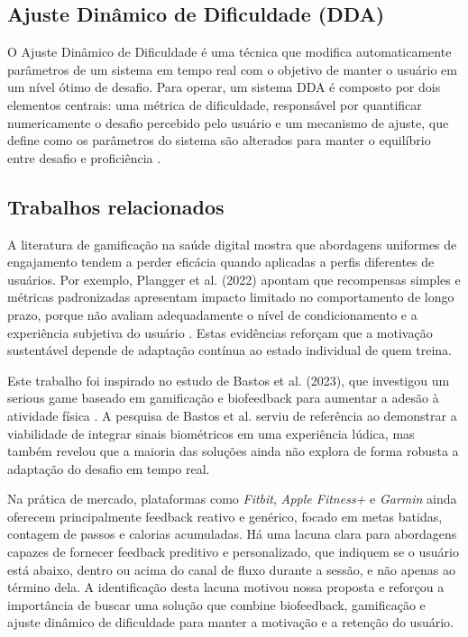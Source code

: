 \subsection{Ajuste Dinâmico de Dificuldade (DDA)}
O Ajuste Dinâmico de Dificuldade é uma técnica que modifica automaticamente parâmetros de um sistema em tempo real com o objetivo de manter o usuário em um nível ótimo de desafio. Para operar, um sistema DDA é composto por dois elementos centrais: uma métrica de dificuldade, responsável por quantificar numericamente o desafio percebido pelo usuário e um mecanismo de ajuste, que define como os parâmetros do sistema são alterados para manter o equilíbrio entre desafio e proficiência \cite{oliveira2025dda}. 

\subsection{Trabalhos relacionados}
A literatura de gamificação na saúde digital mostra que abordagens uniformes de engajamento tendem a perder eficácia quando aplicadas a perfis diferentes de usuários. Por exemplo, Plangger et al. (2022) apontam que recompensas simples e métricas padronizadas apresentam impacto limitado no comportamento de longo prazo, porque não avaliam adequadamente o nível de condicionamento e a experiência subjetiva do usuário \cite{plangger2022little}. Estas evidências reforçam que a motivação sustentável depende de adaptação contínua ao estado individual de quem treina.

Este trabalho foi inspirado no estudo de Bastos et al. (2023), que investigou um serious game baseado em gamificação e biofeedback para aumentar a adesão à atividade física \cite{bastos2023gamification}. A pesquisa de Bastos et al. serviu de referência ao demonstrar a viabilidade de integrar sinais biométricos em uma experiência lúdica, mas também revelou que a maioria das soluções ainda não explora de forma robusta a adaptação do desafio em tempo real.

Na prática de mercado, plataformas como \textit{Fitbit}, \textit{Apple Fitness+} e \textit{Garmin} ainda oferecem principalmente feedback reativo e genérico, focado em metas batidas, contagem de passos e calorias acumuladas. Há uma lacuna clara para abordagens capazes de fornecer feedback preditivo e personalizado, que indiquem se o usuário está abaixo, dentro ou acima do canal de fluxo durante a sessão, e não apenas ao término dela. A identificação desta lacuna motivou nossa proposta e reforçou a importância de buscar uma solução que combine biofeedback, gamificação e ajuste dinâmico de dificuldade para manter a motivação e a retenção do usuário.